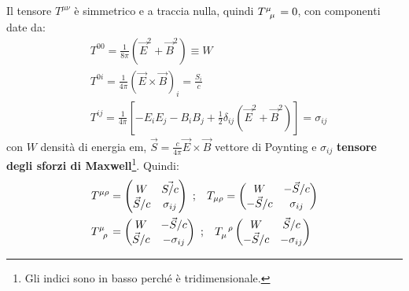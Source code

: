 \documentclass[10pt, a4paper]{scrartcl}
\numberwithin{equation}{subsection}
\theoremstyle{style1}
\begin{document}
\noindent Il tensore $T^{\mu \nu } $ \`e simmetrico e a traccia nulla, quindi $T\indices{^\mu  _\mu } =0$, con componenti date da:
\begin{equation}
	\begin{split}
		&T^{00} = \frac{1}{8\pi} (\vec{E}^2 + \vec{B}^2) \equiv W\\
		&T^{0i} = \frac{1}{4\pi} (\vec{E}\times \vec{B})_i = \frac{S_i}{c}\\
		&T^{ij} = \frac{1}{4\pi}\left[ -E_iE_j - B_iB_j + \frac{1}{2}\delta _{ij} (\vec{E}^2 + \vec{B}^2) \right]  = \sigma _{ij} 
	\end{split}
\end{equation}
con $W$ densit\`a di energia em, $\vec{S}= \frac{c}{4\pi} \vec{E}\times \vec{B}$ vettore di Poynting e $\sigma _{ij} $ \textbf{tensore degli sforzi di Maxwell}\footnote{Gli indici sono in basso perch\'e \`e tridimensionale.}. Quindi:
\begin{equation}
	\begin{split}
		&T^{\mu  \rho } = \begin{pmatrix} W & \vec{S / c} \\ \vec{S}/ c & \sigma _{ij}  \end{pmatrix} \ ; \hspace{.3cm} T_{\mu \rho } = \begin{pmatrix} W& - \vec{S}/c \\ - \vec{S}/c & \sigma _{ij}  \end{pmatrix} \\
		&T\indices{^{\mu }_{\rho }} = \begin{pmatrix} W & - \vec{S}/c \\ \vec{S}/c & -\sigma _{ij} \end{pmatrix} \ ; \hspace{.3cm} T\indices{_{\mu }^{\rho }} \begin{pmatrix} W & \vec{S}/c \\ -\vec{S}/c& - \sigma _{ij}  \end{pmatrix} 
	\end{split}
\end{equation}
\end{document}
